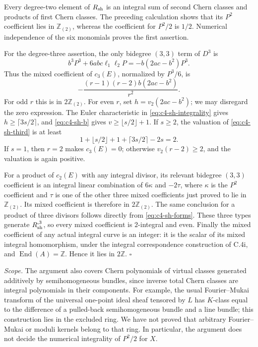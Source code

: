 Every degree-two element of $R_{\rm sh}$ is an integral sum of second
Chern classes and products of first Chern classes. The preceding
calculation shows that its $P^2$ coefficient lies in
$\mathbb Z_{(2)}$, whereas the coefficient for $P^2/2$ is $1/2$.
Numerical independence of the six monomials proves the first assertion.

For the degree-three assertion, the only bidegree $(3,3)$ term of
$D^3$ is
\[
 b^3P^3+6abc\ell_1\ell_2P
       =-b(2ac-b^2)P^3.
\]
Thus the mixed coefficient of $c_3(E)$, normalized by $P^3/6$, is
\begin{equation}\label{eq:c4-sh-third}
                  -\frac{(r-1)(r-2)b(2ac-b^2)}{r^2}.
\end{equation}
For odd $r$ this is in $2\mathbb Z_{(2)}$. For even $r$, set
$h=v_2(2ac-b^2)$; we may disregard the zero expression. The Euler
characteristic in \eqref{eq:c4-sh-integrality} gives
$h\ge\lceil3s/2\rceil$, and \eqref{eq:c4-sh-b} gives
$v\ge\lfloor s/2\rfloor+1$. If $s\ge2$, the valuation of
\eqref{eq:c4-sh-third} is at least
\[
 1+\lfloor s/2\rfloor+1+\lceil3s/2\rceil-2s=2.
\]
If $s=1$, then $r=2$ makes $c_3(E)=0$; otherwise
$v_2(r-2)\ge2$, and the valuation is again positive.

For a product of $c_2(E)$ with any integral divisor, its relevant
bidegree $(3,3)$ coefficient is an integral linear combination of
$6\kappa$ and $-2\tau$, where $\kappa$ is the $P^2$ coefficient and
$\tau$ is one of the other three mixed coefficients just proved to
lie in $\mathbb Z_{(2)}$. Its mixed coefficient is therefore in
$2\mathbb Z_{(2)}$. The same conclusion for a product of three
divisors follows directly from \eqref{eq:c4-sh-forms}. These three
types generate $R_{\rm sh}^{,3}$, so every mixed coefficient is
$2$-integral and even. Finally the mixed coefficient of any actual
integral curve is an integer: it is the scalar of its mixed integral
homomorphism, under the integral correspondence construction of C.4i,
and $\operatorname{End}(A)=\mathbb Z$. Hence it lies in $2\mathbb Z$.
\hfill$\square$

\emph{Scope.}
The argument also covers Chern polynomials of virtual classes generated
additively by semihomogeneous bundles, since inverse total Chern classes
are integral polynomials in their components. For example, the usual
Fourier--Mukai transform of the universal one-point ideal sheaf tensored
by $L$ has $K$-class equal to the difference of a pulled-back
semihomogeneous bundle and a line bundle; this construction lies in the
excluded ring. We have not proved that arbitrary Fourier--Mukai or
moduli kernels belong to that ring. In particular, the argument does
not decide the numerical integrality of $P^2/2$ for $X$.
